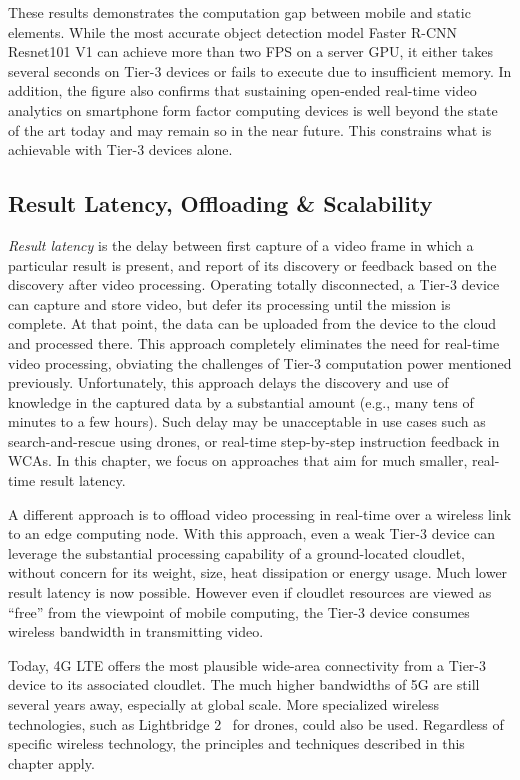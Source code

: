 These results demonstrates the computation gap between mobile and static
elements. While the most accurate object detection model Faster R-CNN Resnet101
V1 can achieve more than two FPS on a server GPU, it either takes several
seconds on Tier-3 devices or fails to execute due to insufficient memory. In
addition, the figure also confirms that sustaining open-ended real-time video
analytics on smartphone form factor computing devices is well beyond the state
of the art today and may remain so in the near future.  This constrains what is
achievable with Tier-3 devices alone.

\subsection{Result Latency, Offloading \& Scalability}
\label{bw:offloading}

{\em Result latency} is the delay between first capture of a video frame in
which a particular result is present, and report of its discovery or feedback
based on the discovery after video processing. Operating totally disconnected, a
Tier-3 device can capture and store video, but defer its processing until the
mission is complete.  At that point, the data can be uploaded from the device to
the cloud and processed there.  This approach completely eliminates the need for
real-time video processing, obviating the challenges of Tier-3 computation power
mentioned previously. Unfortunately, this approach delays the discovery and use
of knowledge in the captured data by a substantial amount (e.g., many tens of
minutes to a few hours).  Such delay may be unacceptable in use cases such as
search-and-rescue using drones, or real-time step-by-step instruction feedback
in WCAs. In this chapter, we focus on approaches that aim for much smaller,
real-time result latency.

A different approach is to offload video processing in real-time over a wireless
link to an edge computing node. With this approach, even a weak Tier-3 device
can leverage the substantial processing capability of a ground-located cloudlet,
without concern for its weight, size, heat dissipation or energy usage.  Much
lower result latency is now possible.  However even if cloudlet resources are
viewed as ``free'' from the viewpoint of mobile computing, the Tier-3 device
consumes wireless bandwidth in transmitting video.

Today, 4G LTE offers the most plausible wide-area connectivity from a Tier-3
device to its associated cloudlet. The much higher bandwidths of 5G are still
several years away, especially at global scale.  More specialized wireless
technologies, such as Lightbridge 2~\cite{LightBridge2} for drones, could also
be used. Regardless of specific wireless technology, the principles and
techniques described in this chapter apply.

